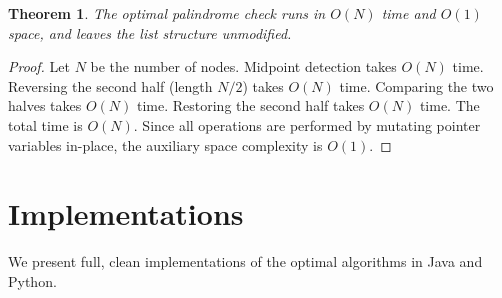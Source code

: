 \documentclass[10pt,journal,compsoc,onecolumn]{IEEEtran}
\newtheorem{theorem}{Theorem}
\begin{document}
\begin{theorem}
The optimal palindrome check runs in $O(N)$ time and $O(1)$ space, and leaves the list structure unmodified.
\end{theorem}
\begin{proof}
Let $N$ be the number of nodes. Midpoint detection takes $O(N)$ time. Reversing the second half (length $N/2$) takes $O(N)$ time. Comparing the two halves takes $O(N)$ time. Restoring the second half takes $O(N)$ time. The total time is $O(N)$. Since all operations are performed by mutating pointer variables in-place, the auxiliary space complexity is $O(1)$.
\end{proof}

\section{Implementations}
We present full, clean implementations of the optimal algorithms in Java and Python.
\end{document}
